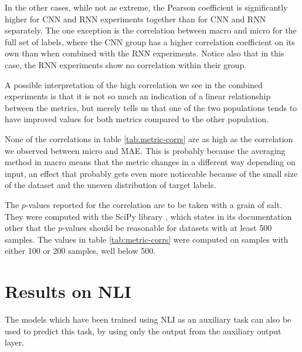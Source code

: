 In the other cases, while not as extreme, the Pearson coefficient is
significantly higher for CNN and RNN experiments together than for CNN and
RNN separately. The one exception is the correlation between macro \FI and
micro \FI for the full set of labels, where the CNN group has a higher
correlation coefficient on its own than when combined with the RNN
experiments. Notice also that in this case, the RNN experiments show no
correlation within their group.

A possible interpretation of the high correlation we see in the combined
experiments is that it is not so much an indication of a linear relationship
between the metrics, but merely tells us that one of the two populations
tends to have improved values for both metrics compared to the other
population.

None of the correlations in table \ref{tab:metric-corrs} are as high as the
correlation we observed between micro \FI and \ac{MAE}. This is probably
because the averaging method in macro \FI means that the metric changes in a
different way depending on input, an effect that probably gets even more
noticeable because of the small size of the dataset and the uneven
distribution of target labels.

The $p$-values reported for the correlation are to be taken with a grain of
salt. They were computed with the SciPy library \autocite{scipy}, which
states in its documentation other that the $p$-values should be reasonable
for datasets with at least 500 samples. The values in table
\ref{tab:metric-corrs} were computed on samples with either 100 or 200
samples, well below 500.

\section{Results on NLI}

The models which have been trained using \ac{NLI} as an auxiliary task can also
be used to predict this task, by using only the output from the auxiliary
output layer.

